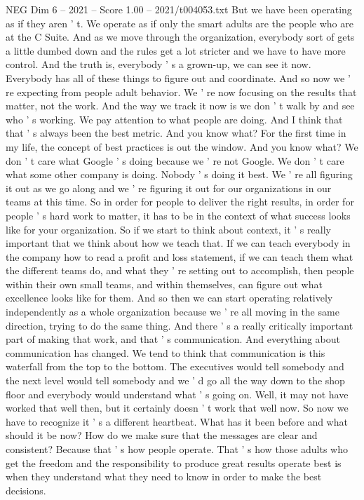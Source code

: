 \begin{textsample}{NEG Dim 6 – 2021 – Score 1.00 – 2021/t004053.txt}
But we have been operating as if they aren ' t.
We operate as if only the smart adults are the people who are at the C Suite.
And as we move through the organization, everybody sort of gets a little dumbed down and the rules get a lot stricter and we have to have more control.
And the truth is, everybody ' s a grown-up, we can see it now.
Everybody has all of these things to figure out and coordinate.
And so now we ' re expecting from people adult behavior.
We ' re now focusing on the results that matter, not the work.
And the way we track it now is we don ' t walk by and see who ' s working.
We pay attention to what people are doing.
And I think that that ' s always been the best metric.
And you know what?
For the first time in my life, the concept of best practices is out the window.
And you know what?
We don ' t care what Google ' s doing because we ' re not Google.
We don ' t care what some other company is doing.
Nobody ' s doing it best.
We ' re all figuring it out as we go along and we ' re figuring it out for our organizations in our teams at this time.
So in order for people to deliver the right results, in order for people ' s hard work to matter, it has to be in the context of what success looks like for your organization.
So if we start to think about context, it ' s really important that we think about how we teach that.
If we can teach everybody in the company how to read a profit and loss statement, if we can teach them what the different teams do, and what they ' re setting out to accomplish, then people within their own small teams, and within themselves, can figure out what excellence looks like for them.
And so then we can start operating relatively independently as a whole organization because we ' re all moving in the same direction, trying to do the same thing.
And there ' s a really critically important part of making that work, and that ' s communication.
And everything about communication has changed.
We tend to think that communication is this waterfall from the top to the bottom.
The executives would tell somebody and the next level would tell somebody and we ' d go all the way down to the shop floor and everybody would understand what ' s going on.
Well, it may not have worked that well then, but it certainly doesn ' t work that well now.
So now we have to recognize it ' s a different heartbeat.
What has it been before and what should it be now?
How do we make sure that the messages are clear and consistent?
Because that ' s how people operate.
That ' s how those adults who get the freedom and the responsibility to produce great results operate best is when they understand what they need to know in order to make the best decisions.

\end{textsample}
